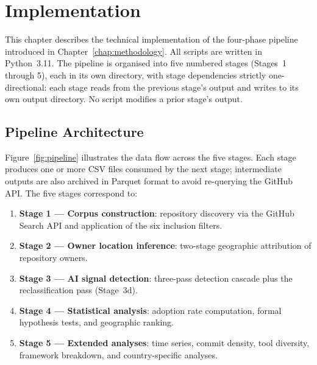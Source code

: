 
\chapter{Implementation}
\label{chap:implementation}

This chapter describes the technical implementation of the four-phase pipeline introduced in Chapter~\ref{chap:methodology}. All scripts are written in Python~3.11. The pipeline is organised into five numbered stages (Stages~1 through 5), each in its own directory, with stage dependencies strictly one-directional: each stage reads from the previous stage's output and writes to its own output directory. No script modifies a prior stage's output.

\section{Pipeline Architecture}
\label{sec:impl:architecture}

Figure~\ref{fig:pipeline} illustrates the data flow across the five stages. Each stage produces one or more CSV files consumed by the next stage; intermediate outputs are also archived in Parquet format to avoid re-querying the GitHub API. The five stages correspond to:

\begin{enumerate}
  \item \textbf{Stage 1 --- Corpus construction}: repository discovery via the GitHub Search API and application of the six inclusion filters.
  \item \textbf{Stage 2 --- Owner location inference}: two-stage geographic attribution of repository owners.
  \item \textbf{Stage 3 --- AI signal detection}: three-pass detection cascade plus the reclassification pass (Stage~3d).
  \item \textbf{Stage 4 --- Statistical analysis}: adoption rate computation, formal hypothesis tests, and geographic ranking.
  \item \textbf{Stage 5 --- Extended analyses}: time series, commit density, tool diversity, framework breakdown, and country-specific analyses.
\end{enumerate}

